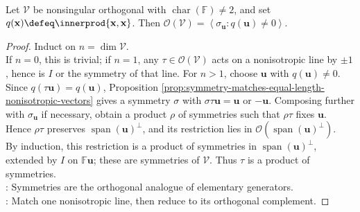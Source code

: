 \begin{theorem} \label{thm:orthogonal-transformations-products-of-symmetries} \\
Let $\mathcal{V}$ be nonsingular orthogonal with $\operatorname{char}(\mathbb{F})\neq2$, and set $q(\mathbf{x})\defeq\innerprod{\mathbf{x},\mathbf{x}}$. Then $\mathcal{O}(\mathcal{V}) = \left\langle \sigma_{\mathbf{u}}:q(\mathbf{u})\neq0\right\rangle$.
\begin{proof}
Induct on $n=\dim\mathcal{V}$.\\
If $n=0$, this is trivial; if $n=1$, any $\tau\in\mathcal{O}(\mathcal{V})$ acts on a nonisotropic line by $\pm1$, hence is $I$ or the symmetry of that line. For $n>1$, choose $\mathbf{u}$ with $q(\mathbf{u})\neq0$. Since $q(\tau\mathbf{u})=q(\mathbf{u})$, Proposition \ref{prop:symmetry-matches-equal-length-nonisotropic-vectors} gives a symmetry $\sigma$ with $\sigma\tau\mathbf{u}=\mathbf{u}$ or $-\mathbf{u}$. Composing further with $\sigma_{\mathbf{u}}$ if necessary, obtain a product $\rho$ of symmetries such that $\rho\tau$ fixes $\mathbf{u}$. Hence $\rho\tau$ preserves $\operatorname{span}(\mathbf{u})^\perp$, and its restriction lies in $\mathcal{O}(\operatorname{span}(\mathbf{u})^\perp)$.\\
By induction, this restriction is a product of symmetries in $\operatorname{span}(\mathbf{u})^\perp$, extended by $I$ on $\mathbb{F}\mathbf{u}$; these are symmetries of $\mathcal{V}$. Thus $\tau$ is a product of symmetries.\\
: Symmetries are the orthogonal analogue of elementary generators.\\
: Match one nonisotropic line, then reduce to its orthogonal complement.
\end{proof}
\end{theorem}

